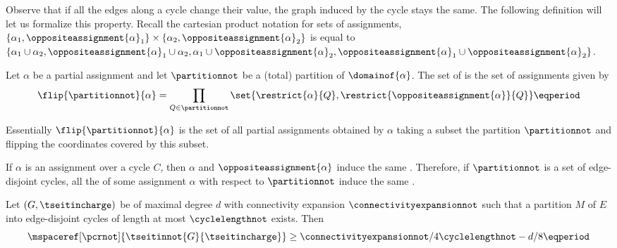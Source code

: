 \documentclass{toc}
\begin{document}
Observe that if all the edges along a cycle change their value, the
graph induced by the cycle stays the same. The following definition
will let us formalize this property. Recall the cartesian product
notation for sets of assignments, \egComma
%
$\{\alpha_{1}, \oppositeassignment{\alpha}_{1}\}
\times
\{\alpha_{2}, \oppositeassignment{\alpha}_{2}\}$ is equal to
%
$\{\alpha_{1} \cup \alpha_{2}, \oppositeassignment{\alpha}_{1} \cup
\alpha_{2}, \alpha_{1} \cup \oppositeassignment{\alpha}_{2},
\oppositeassignment{\alpha}_{1} \cup \oppositeassignment{\alpha}_{2}
\}$.


\begin{definition}[\Flippedassignments]
  \label{def:flippedassignments}
  Let $\alpha$ be a partial assignment and let $\partitionnot$ be a (total) partition of $\domainof{\alpha}$. The set of  is the set of assignments given by
  \begin{equation*}
    \flip{\partitionnot}{\alpha}=\prod_{Q\in\partitionnot}\set{\restrict{\alpha}{Q},\restrict{\oppositeassignment{\alpha}}{Q}} \eqperiod
  \end{equation*}
\end{definition}

Essentially $\flip{\partitionnot}{\alpha}$ is the set of all partial
assignments obtained by $\alpha$ taking a subset the partition
$\partitionnot$ and flipping the coordinates covered by this subset.

\begin{observation}
  \label{obs:flipping-respects-induced}
  If $\alpha$ is an assignment over a cycle $C$, then $\alpha$ and $\oppositeassignment{\alpha}$ induce the same \chargedgraph. Therefore, if $\partitionnot$ is a set of edge-disjoint cycles, all the \flippedassignments of some assignment $\alpha$ with respect to $\partitionnot$ induce the same \chargedgraph.
\end{observation}

\begin{theorem}
  \label{th:tseitin-small-cycles-space-lower-bound-strengthened}
  Let $(G,\tseitincharge)$ be \Gnonsplitting \chargedgraph of maximal degree $d$ with connectivity expansion $\connectivityexpansionnot$ such that a partition $M$ of $E$ into edge-disjoint cycles of length at most $\cyclelengthnot$ exists. Then
  \begin{equation*}
    \mspaceref[\pcrnot]{\tseitinnot{G}{\tseitincharge}}\geq \connectivityexpansionnot/4\cyclelengthnot -d/8 \eqperiod
  \end{equation*}
\end{theorem}
\end{document}
